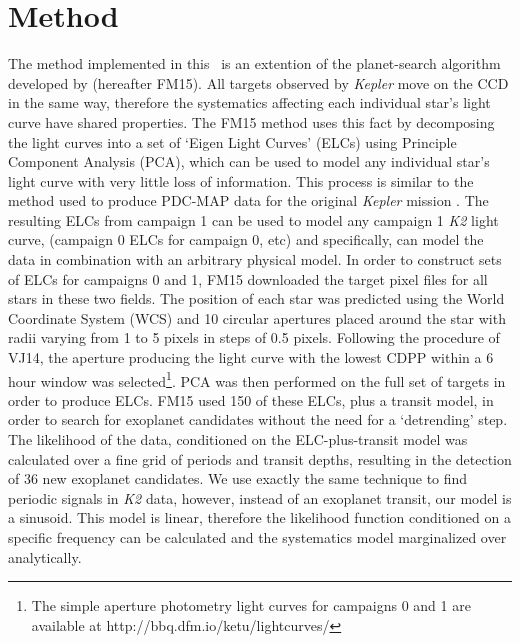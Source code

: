 \documentclass[useAMS, usenatbib, preprint, 12pt]{aastex}
\begin{document}
\section{Method}
\label{sec:Method}

The method implemented in this \article\ is an extention of the planet-search
algorithm developed by \citet{Foreman-Mackey2015} (hereafter FM15).
All targets observed by {\it Kepler} move on the CCD in the same way,
therefore the systematics affecting each individual star's light curve have
shared properties.
The FM15 method uses this fact by decomposing the light curves into a set
of `Eigen Light Curves' (ELCs) using Principle Component Analysis (PCA), which
can be used to model any individual star's light curve with very little loss
of information.
This process is similar to the method used to produce PDC-MAP data for the
original {\it Kepler} mission \citep[][]{Stumpe2012, Smith2012}.
The resulting ELCs from campaign 1 can be used to model any campaign 1 {\it
K2} light curve, (campaign 0 ELCs for campaign 0, etc) and specifically, can
model the data in combination with an arbitrary physical model.
In order to construct sets of ELCs for campaigns 0 and 1, FM15 downloaded the
target pixel files for all stars in these two fields.
The position of each star was predicted using the World Coordinate System (WCS)
and 10 circular apertures placed around the star with radii varying from 1 to
5 pixels in steps of 0.5 pixels.
Following the procedure of VJ14, the aperture producing the
light curve with the lowest CDPP within a 6 hour window
\citep{Christiansen2012} was selected\footnote{The simple aperture photometry
light curves for campaigns 0 and 1 are available at
http://bbq.dfm.io/ketu/lightcurves/}.
PCA was then performed on the full set of targets in order to produce ELCs.
FM15 used 150 of these ELCs, plus a transit model, in order to
search for exoplanet candidates without the need for a `detrending' step.
The likelihood of the data, conditioned on the ELC-plus-transit
model was calculated over a fine grid of periods and transit depths, resulting
in the detection of 36 new exoplanet candidates.
We use exactly the same technique to find periodic signals in {\it K2} data,
however, instead of an exoplanet transit, our model is a sinusoid.
This model is linear, therefore the likelihood function conditioned on
a specific frequency can be calculated and the systematics model marginalized
over analytically.
\end{document}
